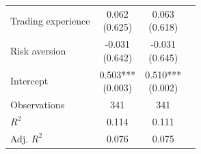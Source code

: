 \begin{threeparttable}
\begin{tabular}{lccc}
Trading experience & \makecell{0.062 \\ (0.625) } & \makecell{0.063 \\ (0.618) } \\
Risk aversion & \makecell{-0.031 \\ (0.642) } & \makecell{-0.031 \\ (0.645) } \\
Intercept & \makecell{0.503*** \\ (0.003) } & \makecell{0.510*** \\ (0.002) } \\
\midrule
\addlinespace
Observations & 341 & 341 \\
$R^2$ & 0.114 & 0.111 \\
Adj. $R^2$ & 0.076 & 0.075 \\
\bottomrule
\end{tabular}
\footnotesize  
\end{threeparttable}